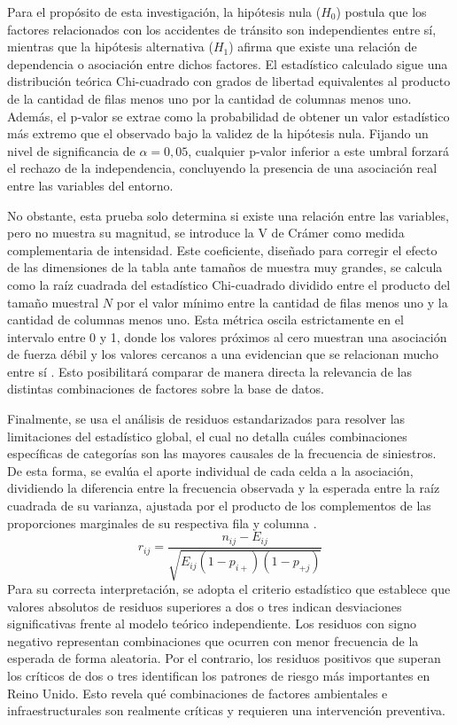 \documentclass[12pt]{article}
\begin{document}
  Para el propósito de esta investigación, la hipótesis nula ($H_0$) postula que 
  los factores relacionados con los accidentes de tránsito son independientes entre sí,
  mientras que la hipótesis alternativa ($H_1$) afirma que existe una relación de 
  dependencia o asociación entre dichos factores. El estadístico calculado sigue 
  una distribución teórica Chi-cuadrado con grados de libertad equivalentes al producto de la cantidad de filas menos uno por la cantidad de columnas menos uno. Además, el p-valor se extrae como la probabilidad de obtener un valor estadístico más extremo que el observado bajo la validez de la hipótesis nula. Fijando un nivel de significancia de $\alpha = 0,05$, cualquier p-valor inferior a este umbral forzará el rechazo de la independencia, concluyendo la presencia de una asociación real entre las variables del entorno.
  
  No obstante, esta prueba solo determina si existe una relación entre las variables, pero no muestra su magnitud, se introduce la V de Crámer como medida complementaria de intensidad. Este coeficiente, diseñado para corregir el efecto de las dimensiones de la tabla ante tamaños de muestra muy grandes, se calcula como la raíz cuadrada del estadístico Chi-cuadrado dividido entre el producto del tamaño muestral $N$ por el valor mínimo entre la cantidad de filas menos uno y la cantidad de columnas menos uno. Esta métrica oscila estrictamente en el intervalo entre 0 y 1, donde los valores próximos al cero muestran una asociación de fuerza débil y los valores cercanos a una evidencian que se relacionan mucho entre sí \parencite{McHugh2013}. Esto posibilitará comparar de manera directa la relevancia de las distintas combinaciones de factores sobre la base de datos.
  
  Finalmente, se usa el análisis de residuos estandarizados para resolver las limitaciones del estadístico global, el cual no detalla cuáles combinaciones específicas de categorías son las mayores causales de la frecuencia de siniestros. De esta forma, se evalúa el aporte individual de cada celda a la asociación, dividiendo la diferencia entre la frecuencia observada y la esperada entre la raíz cuadrada de su varianza, ajustada por el producto de los complementos de las proporciones marginales de su respectiva fila y columna \parencite{Agresti2002}. 
   $$r_{ij} = \frac{n_{ij} - E_{ij}}{\sqrt{E_{ij}(1 - p_{i+})(1 - p_{+j})}}$$
   Para su correcta interpretación, se adopta el criterio estadístico que establece que 
   valores absolutos de residuos superiores a dos o tres indican desviaciones significativas 
   frente al modelo teórico independiente. Los residuos con signo negativo representan 
   combinaciones que ocurren con menor frecuencia de la esperada de forma aleatoria. 
   Por el contrario, los residuos positivos que superan los críticos de dos o tres 
   identifican los patrones de riesgo más importantes en Reino Unido. Esto revela qué 
   combinaciones de factores ambientales e infraestructurales son realmente críticas y 
   requieren una intervención preventiva. \\
\end{document}

